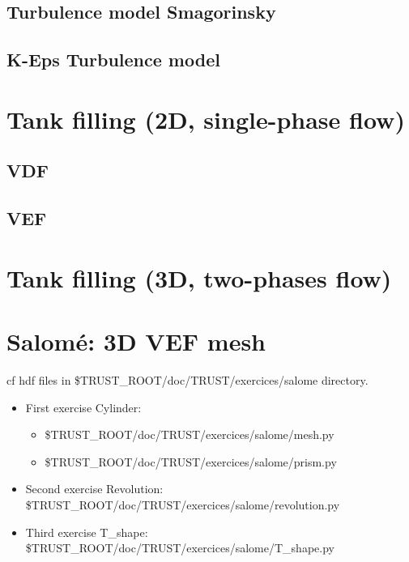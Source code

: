 \documentclass[english]{article}
\begin{document}
\subsection{Turbulence model Smagorinsky}

\subsection{K-Eps Turbulence model}


\section{Tank filling (2D, single-phase flow)}
\subsection{VDF}

\subsection{VEF}


\section{Tank filling (3D, two-phases flow)}


\newpage
\section{Salom\'e: 3D VEF mesh}
cf hdf files in \$TRUST\_ROOT/doc/TRUST/exercices/salome directory.
\begin{itemize}
\item First exercise Cylinder:
\begin{itemize}
\item \$TRUST\_ROOT/doc/TRUST/exercices/salome/mesh.py
\item \$TRUST\_ROOT/doc/TRUST/exercices/salome/prism.py
\end{itemize}
\item Second exercise Revolution:\\
\$TRUST\_ROOT/doc/TRUST/exercices/salome/revolution.py
\item Third exercise T\_shape:\\
\$TRUST\_ROOT/doc/TRUST/exercices/salome/T\_shape.py
\end{itemize}
\end{document}
